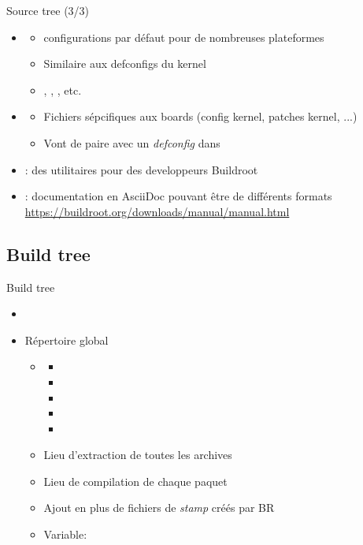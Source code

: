 \documentclass[aspectratio=169,obeyspaces,spaces,hyphens,dvipsnames]{beamer}
\begin{document}
\begin{frame}{Source tree (3/3)}
  \begin{itemize}
  \item {}
    \begin{itemize}
    \item configurations par défaut pour de nombreuses plateformes
    \item Similaire aux defconfigs du kernel
    \item {},
      , , etc.
    \end{itemize}
  \item {}
    \begin{itemize}
    \item Fichiers sépcifiques aux boards (config kernel, patches kernel, ...)
    \item Vont de paire avec un {\em defconfig} dans 
    \end{itemize}
  \item {} : des utilitaires pour des developpeurs Buildroot
  \item {} : documentation en AsciiDoc pouvant être de différents
    formats \url{https://buildroot.org/downloads/manual/manual.html}
  \end{itemize}
\end{frame}

\subsection{Build tree}

\begin{frame}{Build tree}
  \begin{itemize}
  \item {}
  \item Répertoire global
    \begin{itemize}
    \item {}
      \begin{itemize}
        \tiny
      \item {}
      \item {}
      \item {}
      \item {}
      \item {}
      \end{itemize}
    \item Lieu d'extraction de toutes les archives
    \item Lieu de compilation de chaque paquet
    \item Ajout en plus de fichiers de {\em stamp} créés par BR
    \item Variable: 
    \end{itemize}
  \end{itemize}
\end{frame}
\end{document}
